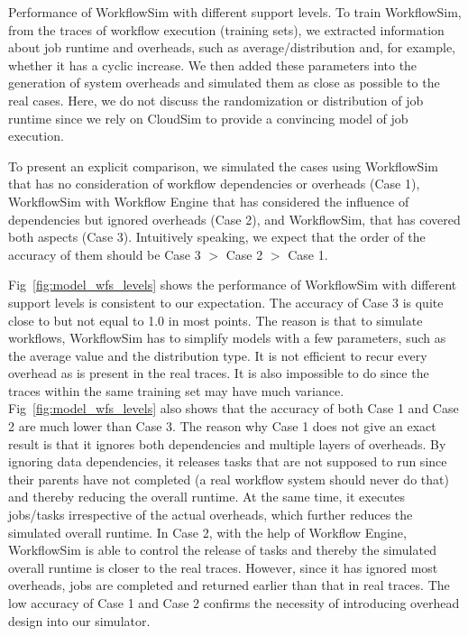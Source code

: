 Performance of WorkflowSim with different support levels. 
To train WorkflowSim, from the traces of workflow execution (training sets), we extracted information about job runtime and overheads, such as average/distribution and, for example, whether it has a cyclic increase. We then added these parameters into the generation of system overheads and simulated them as close as possible to the real cases. Here, we do not discuss the randomization or distribution of job runtime since we rely on CloudSim to provide a convincing model of job execution.

To present an explicit comparison, we simulated the cases using WorkflowSim that has no consideration of workflow dependencies or overheads (Case 1), WorkflowSim with Workflow Engine that has considered the influence of dependencies but ignored overheads (Case 2), and WorkflowSim, that has covered both aspects (Case 3). Intuitively speaking, we expect that the order of the accuracy of them should be Case 3 $>$ Case 2 $>$ Case 1. 

 

Fig~\ref{fig:model_wfs_levels} shows the performance of WorkflowSim with different support levels is consistent to our expectation. The accuracy of Case 3 is quite close to but not equal to 1.0 in most points. The reason is that to simulate workflows, WorkflowSim has to simplify models with a few parameters, such as the average value and the distribution type. It is not efficient to recur every overhead as is present in the real traces. It is also impossible to do since the traces within the same training set may have much variance. Fig~\ref{fig:model_wfs_levels} also shows that the accuracy of both Case 1 and Case 2 are much lower than Case 3. The reason why Case 1 does not give an exact result is that it ignores both dependencies and multiple layers of overheads. By ignoring data dependencies, it releases tasks that are not supposed to run since their parents have not completed (a real workflow system should never do that) and thereby reducing the overall runtime. At the same time, it executes jobs/tasks irrespective of the actual overheads, which further reduces the simulated overall runtime. In Case 2, with the help of Workflow Engine, WorkflowSim is able to control the release of tasks and thereby the simulated overall runtime is closer to the real traces. However, since it has ignored most overheads, jobs are completed and returned earlier than that in real traces. The low accuracy of Case 1 and Case 2 confirms the necessity of introducing overhead design into our simulator. 


